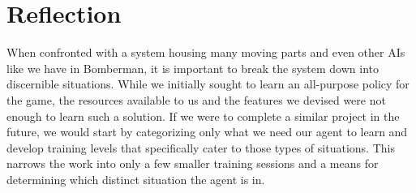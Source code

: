 \documentclass{article}
\begin{document}
\section{Reflection}
When confronted with a system housing many moving parts and even other AIs like we have in Bomberman, it is important to break the system down into discernible situations. While we initially sought to learn an all-purpose policy for the game, the resources available to us and the features we devised were not enough to learn such a solution. If we were to complete a similar project in the future, we would start by categorizing only what we need our agent to learn and develop training levels that specifically cater to those types of situations. This narrows the work into only a few smaller training sessions and a means for determining which distinct situation the agent is in.
\end{document}

